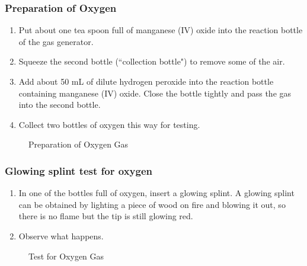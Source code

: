 \subsubsection*{Preparation of Oxygen}
\begin{enumerate}
\item{Put about one tea spoon full of manganese (IV) oxide into the reaction bottle of the gas generator.}
\item{Squeeze the second bottle (``collection bottle") to remove some of the air.}
\item{Add about 50 mL of dilute hydrogen peroxide into the reaction bottle containing manganese (IV) oxide. Close the bottle tightly and pass the gas into the second bottle.}
\item{Collect two bottles of oxygen this way for testing.}
\end{enumerate}
\begin{figure}[h]
\begin{center}
\def\svgwidth{250pt}

\caption{Preparation of Oxygen Gas}
\label{fig:oxygen-prep}
\end{center}
\end{figure}

\subsubsection*{Glowing splint test for oxygen}
\begin{enumerate}
\item{In one of the bottles full of oxygen, insert a glowing splint. A glowing splint can be obtained by lighting a piece of wood on fire and blowing it out, so there is no flame but the tip is still glowing red.}
\item{Observe what happens.}
\end{enumerate}

\begin{figure}[h]
\begin{center}
\def\svgwidth{50pt}

\caption{Test for Oxygen Gas}
\label{fig:glowing-splint_oxygen-test}
\end{center}
\end{figure}

